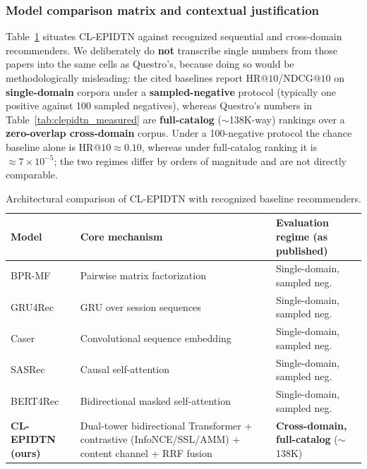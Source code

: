 \subsubsection{Model comparison matrix and contextual justification}
Table~\ref{tab:baseline_matrix} situates CL-EPIDTN against recognized sequential and cross-domain recommenders. We deliberately do \textbf{not} transcribe single numbers from those papers into the same cells as Questro's, because doing so would be methodologically misleading: the cited baselines report $\mathrm{HR}@10$/$\mathrm{NDCG}@10$ on \textbf{single-domain} corpora under a \textbf{sampled-negative} protocol (typically one positive against 100 sampled negatives), whereas Questro's numbers in Table~\ref{tab:clepidtn_measured} are \textbf{full-catalog} ($\sim$138K-way) rankings over a \textbf{zero-overlap cross-domain} corpus. Under a 100-negative protocol the chance baseline alone is $\mathrm{HR}@10 \approx 0.10$, whereas under full-catalog ranking it is $\approx 7\times10^{-5}$; the two regimes differ by orders of magnitude and are not directly comparable.

\begin{table}[H]
    \centering
    \caption{Architectural comparison of CL-EPIDTN with recognized baseline recommenders.}
    \label{tab:baseline_matrix}
    \begin{tabular}{|l|p{5.0cm}|p{3.4cm}|}
        \hline
        \textbf{Model} & \textbf{Core mechanism} & \textbf{Evaluation regime (as published)} \\ \hline
        BPR-MF \cite{rendle2009bpr} & Pairwise matrix factorization & Single-domain, sampled neg. \\ \hline
        GRU4Rec \cite{hidasi2016gru4rec} & GRU over session sequences & Single-domain, sampled neg. \\ \hline
        Caser \cite{tang2018caser} & Convolutional sequence embedding & Single-domain, sampled neg. \\ \hline
        SASRec \cite{kang2018sasrec} & Causal self-attention & Single-domain, sampled neg. \\ \hline
        BERT4Rec \cite{sun2019bert4rec} & Bidirectional masked self-attention & Single-domain, sampled neg. \\ \hline
        \textbf{CL-EPIDTN (ours)} & Dual-tower bidirectional Transformer + contrastive (InfoNCE/SSL/AMM) + content channel + RRF fusion & \textbf{Cross-domain, full-catalog} ($\sim$138K) \\ \hline
    \end{tabular}
\end{table}

